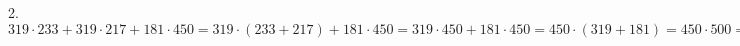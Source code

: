 2.$319\cdot233+319\cdot217+181\cdot450=319\cdot(233+217)+181\cdot450=319\cdot450+181\cdot450=450\cdot(319+181)=450\cdot500=225000.$\\
